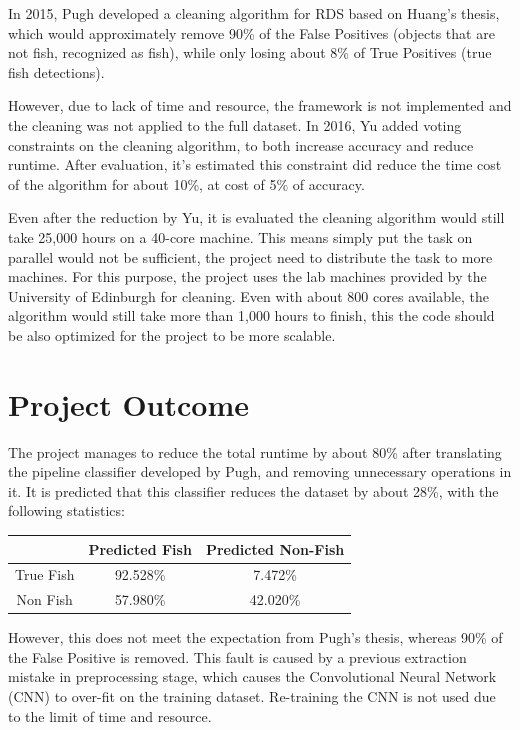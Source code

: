 \documentclass[bsc,frontabs,twoside,fullspacing,parskip,deptreport]{infthesis}
\begin{document}
In 2015, Pugh\cite{Pugh} developed a cleaning algorithm for RDS based on Huang's thesis\cite{Huang}, which would approximately remove 90\% of the False Positives (objects that are not fish, recognized as fish), while only losing about 8\% of True Positives (true fish detections). 

However, due to lack of time and resource, the framework is not implemented and the cleaning was not applied to the full dataset.
In 2016, Yu\cite{Yu} added voting constraints on the cleaning algorithm, to both increase accuracy and reduce runtime. 
After evaluation, it's estimated this constraint did reduce the time cost of the algorithm for about 10\%, at cost of 5\% of accuracy.

Even after the reduction by Yu, it is evaluated the cleaning algorithm would still take 25,000 hours on a 40-core machine\cite{Yu}.
This means simply put the task on parallel would not be sufficient, the project need to distribute the task to more machines.
For this purpose, the project uses the lab machines provided by the University of Edinburgh for cleaning. 
Even with about 800 cores available, the algorithm would still take more than 1,000 hours to finish, this the code should be also optimized for the project to be more scalable.

\section{Project Outcome}

The project manages to reduce the total runtime by about 80\% after translating the pipeline classifier developed by Pugh\cite{Pugh}, and removing unnecessary operations in it. 
It is predicted that this classifier reduces the dataset by about 28\%, with the following statistics:

\begin{center}
\begin{tabular}{ |c|c|c| }
\hline 
$ $ & Predicted Fish & Predicted Non-Fish \\
\hline 
True Fish & 92.528\% & 7.472\% \\
Non Fish & 57.980\% & 42.020\% \\
\hline 
\end{tabular}
\end{center}

However, this does not meet the expectation from Pugh's thesis, whereas 90\% of the False Positive is removed. 
This fault is caused by a previous extraction mistake in preprocessing stage, which causes the Convolutional Neural Network (CNN) to over-fit on the training dataset. 
Re-training the CNN is not used due to the limit of time and resource.
\end{document}
